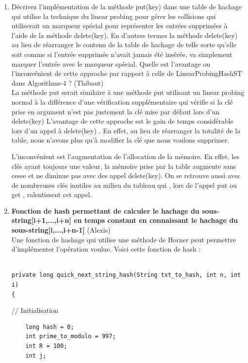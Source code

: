 \documentclass[11pt]{article}
\begin{document}
\begin{enumerate}
\item Décrivez l'implémentation de la méthode put(key) dans une table de hachage qui utilise la technique du linear probing pour gérer les collisions qui utiliserait un marqueur spécial pour représenter les entrées supprimées à l'aide de la méthode delete(key). En d'autres termes la méthode delete(key) au lieu de réarranger le contenu de la table de hachage de telle sorte qu'elle soit comme si l'entrée supprimée n'avait jamais été insérée, va simplement marquer l'entrée avec le marqueur spécial. Quelle est l'avantage ou l'inconvénient de cette approche par rapport à celle de LinearProbingHashST dans Algorithms-4 ? (Thibaut) \\

La méthode put serait similaire à une méthode put utilisant un linear probing normal à la différence d'une vérification supplémentaire qui vérifie si la clé prise en argument n'est pas justement la clé mise par défaut lors d'un delete(key)
L'avantage de cette approche est le gain de temps considérable lors d'un appel à delete(key) . En effet, au lieu de réarranger la totalité de la table, nous n'avons plus qu'à modifier la clé que nous voulons supprimer. 

L'inconvénient est l'augmentation de l'allocation de la mémoire. En effet, les clés ayant toujours une valeur, la mémoire prise par la table augmente sans cesse et ne diminue pas avec des appel delete(key). On se retrouve aussi avec de nombreuses clés inutiles au milieu du tableau qui , lors de l'appel put ou get , ralentissent cet appel.

\item \textbf{Fonction de hash permettant de calculer le hachage du sous-string[i+1,...,i+n] en temps constant en connaissant le hachage du sous-string[i,...,i+n-1]} (Alexis)\\

Une fonction de hashage qui utilise une méthode de Horner peut permettre d'implémenter
l'opération voulue.
Voici cette fonction de hash :

\begin{lstlisting}

private long quick_next_string_hash(String txt_to_hash, int n, int i)
{
\end{lstlisting}
	// Initialisation
\begin{lstlisting}
	long hash = 0;
	int prime_to_modulo = 997;
	int R = 100;
	int j;
	

\end{lstlisting}
\end{enumerate}
\end{document}
